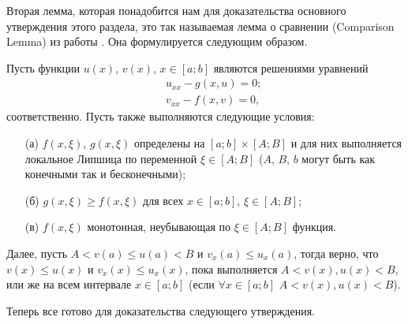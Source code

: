 Вторая лемма, которая понадобится нам для доказательства основного утверждения этого раздела, это так называемая лемма о сравнении (Comparison Lemma) из работы \cite{AlfZez}.
Она формулируется следующим образом.

\begin{lemma}[О сравнении]
Пусть функции $u(x)$, $v(x)$, $x \in [a; b]$ являются решениями уравнений
%
\begin{eqnarray}
&& u_{xx} - g(x, u) = 0; \\
&& v_{xx} - f(x, v) = 0,
\end{eqnarray}
%
соответственно.
Пусть также выполняются следующие условия:
\begin{itemize}
\item[(а)] $f(x, \xi)$, $g(x, \xi)$ определены на $[a; b] \times [A; B]$ и для них выполняется локальное Липшица по переменной $\xi \in [A; B]$ ($A$, $B$, $b$ могут быть как конечными так и бесконечными);
\item[(б)] $g(x, \xi) \ge f(x, \xi)$ для всех $x \in [a; b]$, $\xi \in [A; B]$;
\item[(в)] $f(x, \xi)$ монотонная, неубывающая по $\xi \in [A; B]$ функция.
\end{itemize}
Далее, пусть $A < v(a) \le u(a) < B$ и $v_x(a) \le u_x(a)$, тогда верно, что $v(x) \le u(x)$ и $v_x(x) \le u_x(x)$, пока выполняется $A < v(x), u(x) < B$, или же на всем интервале $x \in [a; b]$ (если $\forall x \in [a; b]$ $A < v(x), u(x) < B$).
\label{lemma:comparison}
\end{lemma}

Теперь все готово для доказательства следующего утверждения.


